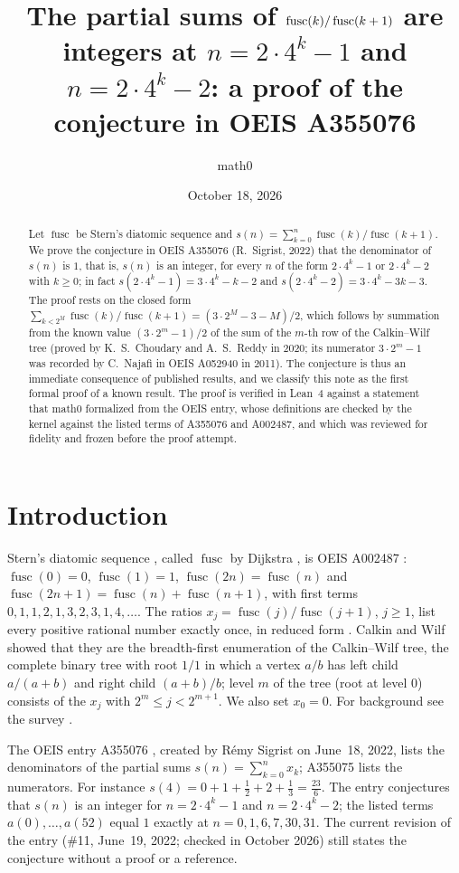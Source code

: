 \documentclass[11pt]{amsart}
\title[Integer partial sums of $\fusc(k)/\fusc(k+1)$ (OEIS A355076)]{The partial sums of $\fusc(k)/\fusc(k+1)$ are integers at $n=2\cdot4^k-1$ and $n=2\cdot4^k-2$: a proof of the conjecture in OEIS A355076}
\author{math0}
\date{October 18, 2026}
\theoremstyle{plain}
\theoremstyle{definition}
\DeclareMathOperator{\fusc}{fusc}
\begin{document}
\begin{abstract}
Let $\fusc$ be Stern's diatomic sequence and $s(n)=\sum_{k=0}^{n}\fusc(k)/\fusc(k+1)$. We prove the conjecture in OEIS A355076 (R.~Sigrist, 2022) that the denominator of $s(n)$ is $1$, that is, $s(n)$ is an integer, for every $n$ of the form $2\cdot4^k-1$ or $2\cdot4^k-2$ with $k\ge0$; in fact $s(2\cdot4^k-1)=3\cdot4^k-k-2$ and $s(2\cdot4^k-2)=3\cdot4^k-3k-3$.
The proof rests on the closed form $\sum_{k<2^M}\fusc(k)/\fusc(k+1)=(3\cdot2^M-3-M)/2$, which follows by summation from the known value $(3\cdot2^m-1)/2$ of the sum of the $m$-th row of the Calkin--Wilf tree (proved by K.~S.~Choudary and A.~S.~Reddy in 2020; its numerator $3\cdot2^m-1$ was recorded by C.~Najafi in OEIS A052940 in 2011).
The conjecture is thus an immediate consequence of published results, and we classify this note as the first formal proof of a known result.
The proof is verified in Lean~4 against a statement that math0 formalized from the OEIS entry, whose definitions are checked by the kernel against the listed terms of A355076 and A002487, and which was reviewed for fidelity and frozen before the proof attempt.
\end{abstract}
\maketitle

\section{Introduction}

Stern's diatomic sequence \cite{Stern}, called $\fusc$ by Dijkstra \cite{Dijkstra}, is OEIS A002487 \cite{A002487}: $\fusc(0)=0$, $\fusc(1)=1$, $\fusc(2n)=\fusc(n)$ and $\fusc(2n+1)=\fusc(n)+\fusc(n+1)$, with first terms $0,1,1,2,1,3,2,3,1,4,\dots$. The ratios $x_j=\fusc(j)/\fusc(j+1)$, $j\ge1$, list every positive rational number exactly once, in reduced form \cite{Stern,CW}. Calkin and Wilf \cite{CW} showed that they are the breadth-first enumeration of the Calkin--Wilf tree, the complete binary tree with root $1/1$ in which a vertex $a/b$ has left child $a/(a+b)$ and right child $(a+b)/b$; level $m$ of the tree (root at level $0$) consists of the $x_j$ with $2^m\le j<2^{m+1}$. We also set $x_0=0$. For background see the survey \cite{Northshield}.

The OEIS entry A355076 \cite{A355076}, created by R\'emy Sigrist on June~18, 2022, lists the denominators of the partial sums $s(n)=\sum_{k=0}^{n}x_k$; A355075 \cite{A355075} lists the numerators. For instance $s(4)=0+1+\frac12+2+\frac13=\frac{23}6$. The entry conjectures that $s(n)$ is an integer for $n=2\cdot4^k-1$ and $n=2\cdot4^k-2$; the listed terms $a(0),\dots,a(52)$ equal $1$ exactly at $n=0,1,6,7,30,31$. The current revision of the entry (\#11, June~19, 2022; checked in October 2026) still states the conjecture without a proof or a reference.
\end{document}
